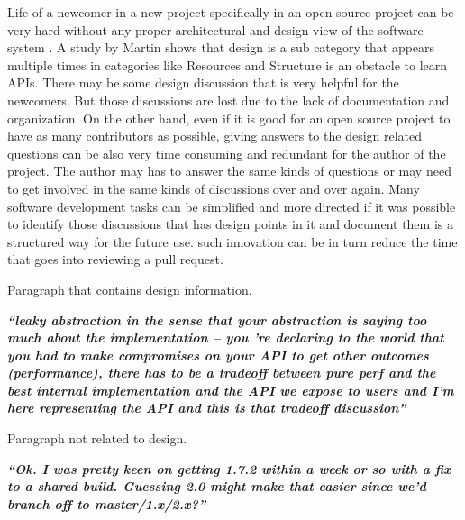 Life of a newcomer in a new project specifically in an open source project can be very hard without any proper architectural and design view of the software system \cite{Steinmacher2014}. A study by Martin \cite{Robillard2009} shows that design is a sub category that appears multiple times in categories like Resources and Structure is an obstacle to learn APIs. There may be some design discussion that is very helpful for the newcomers. But those discussions are lost due to the lack of documentation and organization. On the other hand, even if it is good for an open source project to have as many contributors as possible, giving answers to the design related questions can be also very time consuming and redundant for the author of the project. The author may has to answer the same kinds of questions or may need to get involved in the same kinds of discussions over and over again. Many software development tasks can be simplified and more directed if it was possible to identify those discussions that has design points in it and document them is a structured way for the future use. such innovation can be in turn reduce the time that goes into reviewing a pull request.
\begin{table}
	\caption{Paragraph that contains design information.\cite{Viviani2018}}	
		\textbf{\textit{``leaky abstraction in the sense that your abstraction is saying too much about the implementation -- you 're declaring to the world that you had to make compromises on your API to get other outcomes (performance), there has to be a tradeoff between pure perf and the best internal implementation and the API we expose to users and I'm here representing the API and this is that tradeoff discussion''}}	
\end{table}
\begin{table}
	\caption{Paragraph not related to design.\cite{Viviani2018}}
	\textbf{\textit{``Ok. I was pretty keen on getting 1.7.2 within a week or so with a fix to a shared build. Guessing 2.0 might make that easier since we'd branch off to master/1.x/2.x?''}}
\end{table}


